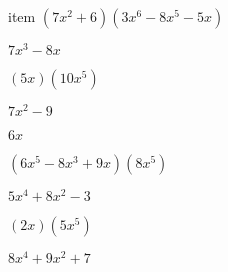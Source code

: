 \documentclass{article}
\begin{document}
\begin{multicols}{2}
item $(7x^2+6)(3x^{6}-8x^{5}-5x)$\item $7x^{3}-8x$\item $(5x)(10x^{5})$\item $7x^2-9$\item $6x$\item $(6x^{5}-8x^{3}+9x)(8x^{5})$\item $5x^{4}+8x^2-3$\item $(2x)(5x^{5})$\item $8x^{4}+9x^2+7$\ite
\end{multicols}
\end{document}
